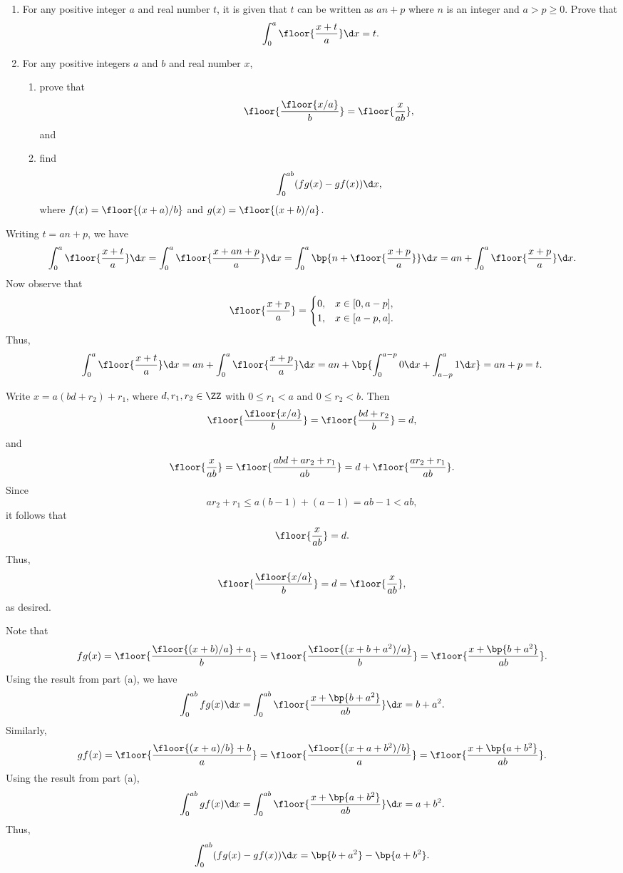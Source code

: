\begin{problem}
    \begin{enumerate}
        \item For any positive integer $a$ and real number $t$, it is given that $t$ can be written as $an + p$ where $n$ is an integer and $a > p \geq 0$. Prove that \[\int_0^a \floor{\frac{x+t}{a}} \d x = t.\]
        \item For any positive integers $a$ and $b$ and real number $x$,
        \begin{enumerate}
            \item prove that \[\floor{\frac{\floor{x/a}}{b}} = \floor{\frac{x}{ab}},\] and
            \item find \[\int_0^{ab} (fg(x) - gf(x)) \d x,\] where $f(x) = \floor{(x+a)/b}$ and $g(x) = \floor{(x+b)/a}$.
        \end{enumerate}
    \end{enumerate}
\end{problem}
\begin{solution}
    \begin{ppart}
        Writing $t = an + p$, we have \[\int_0^a \floor{\frac{x+t}{a}} \d x = \int_0^a \floor{\frac{x + an + p}{a}} \d x = \int_0^a \bp{n + \floor{\frac{x + p}{a}}} \d x = an + \int_0^a \floor{\frac{x+p}{a}} \d x.\] Now observe that \[\floor{\frac{x+p}{a}} = \begin{cases}
            0, & x \in [0, a-p], \\
            1, & x \in [a-p, a].
        \end{cases}\] Thus, \[\int_0^a \floor{\frac{x+t}{a}} \d x = an + \int_0^a \floor{\frac{x+p}{a}} \d x = an + \bp{\int_0^{a-p} 0 \d x + \int_{a-p}^a 1 \d x} = an + p = t.\]
    \end{ppart}
    \begin{ppart}
        \begin{psubpart}
            Write $x = a(bd + r_2) + r_1$, where $d, r_1, r_2 \in \ZZ$ with $0 \leq r_1 < a$ and $0 \leq r_2 < b$. Then \[\floor{\frac{\floor{x/a}}{b}} = \floor{\frac{bd + r_2}{b}} = d,\] and \[\floor{\frac{x}{ab}} = \floor{\frac{abd + ar_2 + r_1}{ab}} = d + \floor{\frac{ar_2 + r_1}{ab}}.\] Since \[ar_2 + r_1 \leq a(b-1) + (a-1) = ab - 1 < ab,\] it follows that \[\floor{\frac{x}{ab}} = d.\] Thus, \[\floor{\frac{\floor{x/a}}{b}} = d = \floor{\frac{x}{ab}},\] as desired.
        \end{psubpart}
        \begin{psubpart}
            Note that \[fg(x) = \floor{\frac{\floor{(x+b)/a} + a}b} = \floor{\frac{\floor{(x+b+a^2)/a}}{b}} = \floor{\frac{x + \bp{b + a^2}}{ab}}.\] Using the result from part (a), we have \[\int_0^{ab} fg(x) \d x = \int_0^{ab} \floor{\frac{x + \bp{b + a^2}}{ab}} \d x = b + a^2.\] Similarly, \[gf(x) = \floor{\frac{\floor{(x+a)/b} + b}{a}} = \floor{\frac{\floor{(x+a + b^2)/b}}{a}} = \floor{\frac{x + \bp{a + b^2}}{ab}}.\] Using the result from part (a), \[\int_0^{ab} gf(x) \d x = \int_0^{ab} \floor{\frac{x + \bp{a + b^2}}{ab}} \d x = a + b^2.\] Thus, \[\int_0^{ab} (fg(x) - gf(x)) \d x = \bp{b + a^2} - \bp{a + b^2}.\]
        \end{psubpart}
    \end{ppart}
\end{solution}


